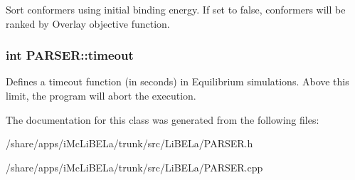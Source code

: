 \label{classPARSER_a2b4a169dd1600254c33ebb5338342795}
Sort conformers using initial binding energy. If set to false, conformers will be ranked by Overlay objective function. \hypertarget{classPARSER_afbcdf1c31d8279ba29032abe0cba11a8}{
\subsubsection[{timeout}]{\setlength{\rightskip}{0pt plus 5cm}int {\bf PARSER::timeout}}}
\label{classPARSER_afbcdf1c31d8279ba29032abe0cba11a8}
Defines a timeout function (in seconds) in Equilibrium simulations. Above this limit, the program will abort the execution. 

The documentation for this class was generated from the following files:\begin{DoxyCompactItemize}
\item 
/share/apps/iMcLiBELa/trunk/src/LiBELa/PARSER.h\item 
/share/apps/iMcLiBELa/trunk/src/LiBELa/PARSER.cpp\end{DoxyCompactItemize}
